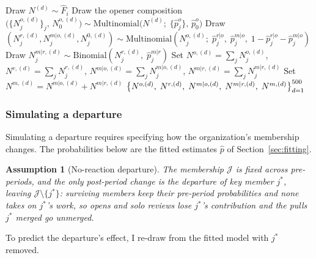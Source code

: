 \documentclass[12pt,notitlepage]{article}
\newtheorem{assumption}{Assumption}
\begin{document}
\begin{algorithm}[t]
\caption{DrawCounts($\hat{F}_i,\;\{\hat{p}_j^o\},\;\{\hat{p}_j^{r|o}\},\;\{\hat{p}_j^{m|o}\},\;\{\hat{p}_j^{m|r}\}$)}
\label{alg:drawcounts}
\begin{algorithmic}[1]
  \State Draw $N^{(d)} \sim \hat{F}_i$
  \State Draw the opener composition $\bigl(\{N_j^{o,(d)}\}_{j},\,N_0^{o,(d)}\bigr) \sim \mathrm{Multinomial}\bigl(N^{(d)};\;\{\hat{p}_j^o\},\,\hat{p}_0^o\bigr)$
    \State Draw $(N_j^{r,(d)},N_j^{m|o,(d)},N_j^{0,(d)}) \sim \mathrm{Multinomial}(N_j^{o,(d)};\;\hat{p}_j^{r|o},\;\hat{p}_j^{m|o},\;1-\hat{p}_j^{r|o}-\hat{p}_j^{m|o})$
    \State Draw $N_j^{m|r,(d)} \sim \mathrm{Binomial}(N_j^{r,(d)},\;\hat{p}_j^{m|r})$
  \EndFor
  \State Set $N^{o,(d)}=\sum_j N_j^{o,(d)}$, $N^{r,(d)}=\sum_j N_j^{r,(d)}$, $N^{m|o,(d)}=\sum_j N_j^{m|o,(d)}$, $N^{m|r,(d)}=\sum_j N_j^{m|r,(d)}$
  \State Set $N^{m,(d)} = N^{m|o,(d)} + N^{m|r,(d)}$
\EndFor
\State \Return $\bigl\{N^{o,(d)},\;N^{r,(d)},\;N^{m|o,(d)},\;N^{m|r,(d)},\;N^{m,(d)}\bigr\}_{d=1}^{500}$
\end{algorithmic}
\end{algorithm}

\subsubsection{Simulating a departure}
\label{sec:counterfactual}
Simulating a departure requires specifying how the organization's membership changes.
The probabilities below are the fitted estimates $\hat p$ of Section~\ref{sec:fitting}.

\begin{assumption}[No-reaction departure]
\label{asm:departure-response}
The membership $\mathcal{J}$ is fixed across pre-periods, and the only post-period change is the departure of key member $j^*$, leaving $\mathcal{J}\setminus\{j^*\}$: surviving members keep their pre-period probabilities and none takes on $j^*$'s work, so opens and solo reviews lose $j^*$'s contribution and the pulls $j^*$ merged go unmerged.
\end{assumption}

To predict the departure's effect, I re-draw from the fitted model with $j^*$ removed.
\end{document}
